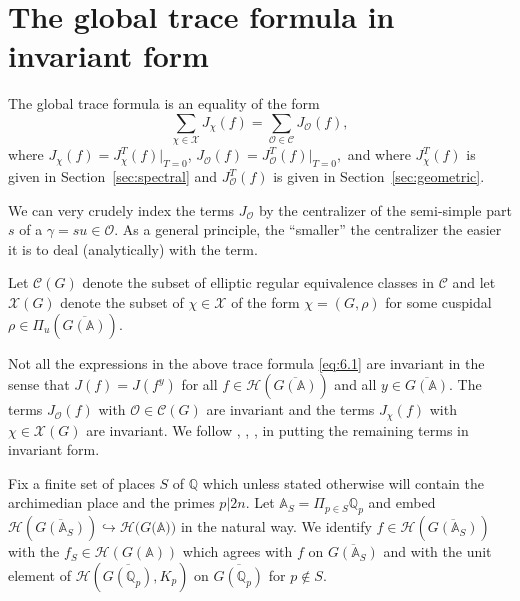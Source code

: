 
\section{The global trace formula in invariant form}\label{sec:invariant}

The global trace formula is an equality of the form 
\begin{equation}\label{eq:6.1}
\sum_{\chi \in {\mathcal X}}J_\chi (f) =\sum_{{\mathcal{O}}\in {\mathcal C}}
J_{{\mathcal{O}}}(f),
\end{equation}
where $J_\chi (f)=J_\chi ^T(f)|_{T=0}$,
$J_{{\mathcal{O}}}(f)=J_{{\mathcal{O}}}^T(f)|_{T=0},$ and where
$J_\chi ^T(f)$ is given in Section~\ref{sec:spectral} and
$J_{{\mathcal{O}}}^T(f)$ is given in Section~\ref{sec:geometric}.

We can very crudely index the terms $J_{\mathcal{O}}$ by the centralizer
of the semi-simple part $s$ of a $\gamma =su\in {\mathcal{O}}$. As a
general principle, the ``smaller'' the centralizer the easier it is
to deal (analytically) with the term. 

Let ${\mathcal C}(G)$ denote the subset
of elliptic regular equivalence classes in ${\mathcal C}$ and let
${\mathcal{X}}(G)$
denote the subset of $\chi \in {\mathcal{X}}$ of the form $\chi=(G,\rho )$ for
some cuspidal
$\rho \in \Pi _u(\overline{G({\mathbb {A}})})$.

Not all the expressions in the above trace formula \eqref{eq:6.1} are invariant in
the sense that $J(f)=J(f^y)$ for all
$f\in {\mathcal{H}}(\overline{G({\mathbb {A}})}) $ and all
$y\in \overline{G({\mathbb {A}})}$. The terms $J_{{\mathcal{O}}}(f)$
with ${\mathcal{O}}\in {\mathcal{C}}(G)$ are invariant and the terms
$J_\chi (f)$ with $\chi \in {\mathcal{X}}(G)$ are invariant.
We follow \cite{A6}, \cite{A9}, \cite{A10}, in putting
the remaining terms in invariant form.

Fix a finite set of places $S$ of ${\mathbb {Q}}$ which
unless stated otherwise
will contain the archimedian place and the primes $p|2n$.
Let ${\mathbb {A}}_S=\Pi _{p\in S}{\mathbb {Q}}_p$ and embed
${\mathcal{H}}(\overline{G({\mathbb{A}}_S)})\hookrightarrow {\mathcal{H}}(G({\mathbb {A}))}$
in the natural way. We identify $f\in {\mathcal{H}}(\overline{G({\mathbb{A}}_S)})$
with the $f_S\in {\mathcal{H}}(G({\mathbb {A}}))$ which agrees
with $f$ on $\overline{G({\mathbb{A}}_S)}$ and with the unit
element of ${\mathcal{H}}(\overline{G({\mathbb{Q}}_p)},K_p)$
on $\overline{G({\mathbb{Q}}_p)} $ for $p\notin S$.

